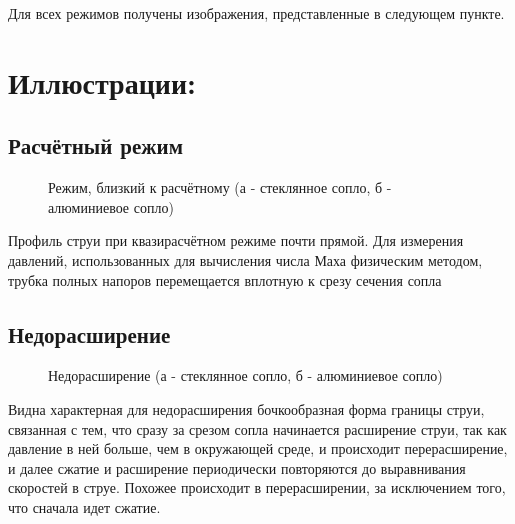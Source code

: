\documentclass[a4paper]{article}
\begin{document}
Для всех режимов получены изображения, представленные в следующем пункте.


\section*{Иллюстрации:}


\subsection*{Расчётный режим}
\begin{figure}[h]
\begin{minipage}[h]{0.5\linewidth}
\end{minipage}
\hfill
\begin{minipage}[h]{0.5\linewidth}
\end{minipage}
\caption{Режим, близкий к расчётному (а - стеклянное сопло, б - алюминиевое сопло)}
\label{ris:image1}
\end{figure}

Профиль струи при квазирасчётном режиме почти прямой. Для измерения давлений, использованных для вычисления числа Маха физическим методом, трубка полных напоров перемещается вплотную к срезу сечения сопла
\newpage
\subsection*{Недорасширение}

\begin{figure}[h]
\begin{minipage}[h]{0.5\linewidth}
\end{minipage}
\hfill
\begin{minipage}[h]{0.5\linewidth}
\end{minipage}
\caption{Недорасширение (а - стеклянное сопло, б - алюминиевое сопло)}
\label{ris:image1}
\end{figure}


Видна характерная для недорасширения бочкообразная форма границы струи, связанная с тем, что сразу за срезом сопла начинается расширение струи, так как давление в ней больше, чем в окружающей среде, и происходит перерасширение, и далее сжатие и расширение периодически повторяются до выравнивания скоростей в струе. Похожее происходит в перерасширении, за исключением того, что сначала идет сжатие.
\end{document}
